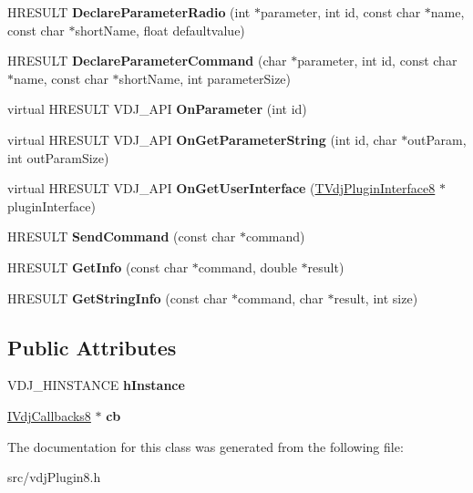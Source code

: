 \begin{DoxyCompactItemize}
\item 
\mbox{\label{classIVdjPlugin8_a9b2047ebefc35d7ea4160233de3baf28}} 
H\+R\+E\+S\+U\+LT {\bfseries Declare\+Parameter\+Radio} (int $\ast$parameter, int id, const char $\ast$name, const char $\ast$short\+Name, float defaultvalue)
\item 
\mbox{\label{classIVdjPlugin8_a2b3826b844605723569da77ced2e36ee}} 
H\+R\+E\+S\+U\+LT {\bfseries Declare\+Parameter\+Command} (char $\ast$parameter, int id, const char $\ast$name, const char $\ast$short\+Name, int parameter\+Size)
\item 
\mbox{\label{classIVdjPlugin8_a60e9027c4a583a2cdd739eae3dba0f0d}} 
virtual H\+R\+E\+S\+U\+LT V\+D\+J\+\_\+\+A\+PI {\bfseries On\+Parameter} (int id)
\item 
\mbox{\label{classIVdjPlugin8_a5dec0d88ee3d449d0b191e2a36a9837a}} 
virtual H\+R\+E\+S\+U\+LT V\+D\+J\+\_\+\+A\+PI {\bfseries On\+Get\+Parameter\+String} (int id, char $\ast$out\+Param, int out\+Param\+Size)
\item 
\mbox{\label{classIVdjPlugin8_a774e79c75ba05e853a0de10242bbee06}} 
virtual H\+R\+E\+S\+U\+LT V\+D\+J\+\_\+\+A\+PI {\bfseries On\+Get\+User\+Interface} (\hyperlink{structTVdjPluginInterface8}{T\+Vdj\+Plugin\+Interface8} $\ast$plugin\+Interface)
\item 
\mbox{\label{classIVdjPlugin8_a786f7417cdce43e1c5c76c8ca9261f3c}} 
H\+R\+E\+S\+U\+LT {\bfseries Send\+Command} (const char $\ast$command)
\item 
\mbox{\label{classIVdjPlugin8_a9edae9daec17cf9f9310f76c1c676537}} 
H\+R\+E\+S\+U\+LT {\bfseries Get\+Info} (const char $\ast$command, double $\ast$result)
\item 
\mbox{\label{classIVdjPlugin8_aa4b2ca8146adac0d7f9a7b0dc1bd92e8}} 
H\+R\+E\+S\+U\+LT {\bfseries Get\+String\+Info} (const char $\ast$command, char $\ast$result, int size)
\end{DoxyCompactItemize}
\subsection*{Public Attributes}
\begin{DoxyCompactItemize}
\item 
\mbox{\label{classIVdjPlugin8_a63c6c04d5ded84e16ca23329ed682490}} 
V\+D\+J\+\_\+\+H\+I\+N\+S\+T\+A\+N\+CE {\bfseries h\+Instance}
\item 
\mbox{\label{classIVdjPlugin8_a7d7012ae0b26d9700107408c0ec229ed}} 
\hyperlink{structIVdjCallbacks8}{I\+Vdj\+Callbacks8} $\ast$ {\bfseries cb}
\end{DoxyCompactItemize}


The documentation for this class was generated from the following file\+:\begin{DoxyCompactItemize}
\item 
src/vdj\+Plugin8.\+h\end{DoxyCompactItemize}
